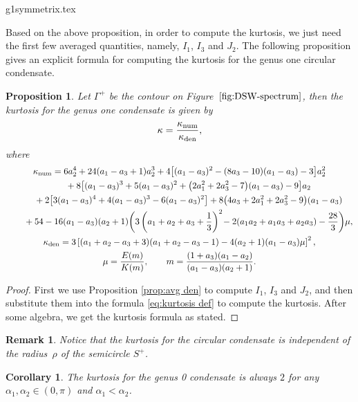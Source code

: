 \documentclass[pdftex]{sigma}
\numberwithin{equation}{section}
\newtheorem{Corollary}[Theorem]{Corollary}
\newtheorem{Proposition}[Theorem]{Proposition}
\newtheorem{Remark}[Theorem]{Remark}
\newcommand{\G}{\Gamma}
\def\G{\Gamma}
\begin{document}
{g1symmetrix.tex}

Based on the above proposition, in order to compute the kurtosis, we just need the first few averaged quantities, namely, $I_1$, $I_3$ and $J_2$. The following proposition gives an explicit formula for computing the kurtosis for the genus one circular condensate.

\begin{Proposition}\label{prop:g1 kur}
Let $\G^+$ be the contour on Figure~$\ref{fig:DSW-spectrum}$, then the kurtosis for the genus one condensate is given by
\begin{align}
\kappa=\frac{\kappa_{\rm num}}{\kappa_{\rm den}}, \label{eq:g1-kurtosis}
\end{align}
where
\begin{gather*}
\kappa_{\rm num}=6a_2^4+24(a_1-a_3+1)a_2^3+4\bigl[(a_1-a_3)^2-(8a_3-10)(a_1-a_3)-3\bigr]a_2^2\\ \qquad{}
+8\bigl[(a_1-a_3)^3+5(a_1-a_3)^2+\bigl(2a_1^2+2a_3^2-7\bigr)(a_1-a_3)-9\bigr]a_2\\ \qquad{}
+2\bigl[3(a_1-a_3)^4+4(a_1-a_3)^3-6(a_1-a_3)^2\bigr]+8\bigl(4a_3+2a_1^2+2a_3^2-9\bigr)(a_1-a_3)\\ \qquad{}
+54-16(a_1-a_3)(a_2+1)\biggl(3\left(a_1+a_2+a_3+\frac{1}{3}\right)^2\!-2(a_1a_2+a_1a_3+a_2a_3)-\frac{28}{3}\biggr)\mu,\\
\kappa_{\rm den}=3\left[(a_1+a_2-a_3+3)(a_1+a_2-a_3-1)-4(a_2+1)(a_1-a_3)\mu\right]^2,\\
\mu=\frac{E(m)}{K(m)},\qquad m=\frac{(1+a_3)(a_1-a_2)}{(a_1-a_3)(a_2+1)}.
\end{gather*}
\end{Proposition}

\begin{proof}
First we use Proposition \ref{prop:avg den} to compute $I_1$, $I_3$ and $J_2$, and then substitute them into the formula \eqref{eq:kurtosis def} to compute the kurtosis. After some algebra, we get the kurtosis formula as stated.
\end{proof}

\begin{Remark}
Notice that the kurtosis for the circular condensate is independent of the radius~$\rho$ of the semicircle $S^+$.
\end{Remark}

\begin{Corollary}\label{thm: g0 kur}
The kurtosis for the genus 0 condensate is always $2$ for any $\alpha_1,\alpha_2\in (0,\pi)$ and $\alpha_1<\alpha_2$.
\end{Corollary}
\end{document}
